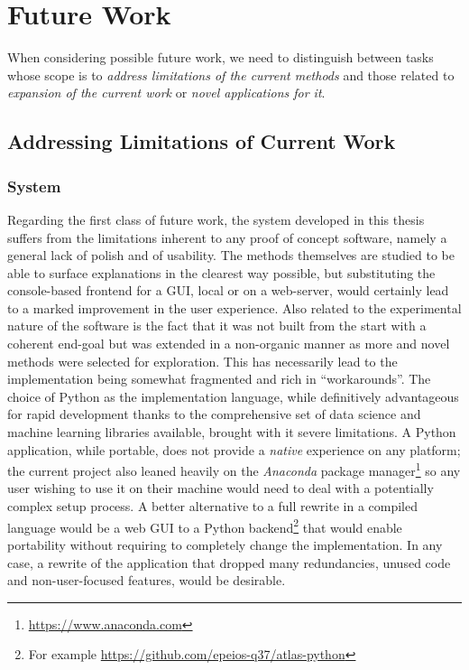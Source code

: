 \section{Future Work} \label{sec:future-work}
When considering possible future work, we need to distinguish between tasks whose scope is to \textit{address limitations of the current methods} and those related to \textit{expansion of the current work} or \textit{novel applications for it}.

\subsection{Addressing Limitations of Current Work}
\subsubsection{System}
Regarding the first class of future work, the system developed in this thesis suffers from the limitations inherent to any proof of concept software, namely a general lack of polish and of usability.
The methods themselves are studied to be able to surface explanations in the clearest way possible, but substituting the console-based frontend for a GUI, local or on a web-server, would certainly lead to a marked improvement in the user experience.
Also related to the experimental nature of the software is the fact that it was not built from the start with a coherent end-goal but was extended in a non-organic manner as more and novel methods were selected for exploration.
This has necessarily lead to the implementation being somewhat fragmented and rich in \enquote{workarounds}.
The choice of Python as the implementation language, while definitively advantageous for rapid development thanks to the comprehensive set of data science and machine learning libraries available, brought with it severe limitations.
A Python application, while portable, does not provide a \textit{native} experience on any platform; the current project also leaned heavily on the \textit{Anaconda} package manager\footnote{\url{https://www.anaconda.com}} so any user wishing to use it on their machine would need to deal with a potentially complex setup process.
A better alternative to a full rewrite in a compiled language would be a web GUI to a Python backend\footnote{For example \url{https://github.com/epeios-q37/atlas-python}} that would enable portability without requiring to completely change the implementation.
In any case, a rewrite of the application that dropped many redundancies, unused code and non-user-focused features, would be desirable.

